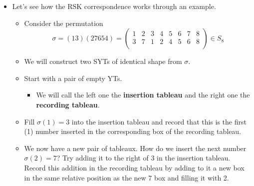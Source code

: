\documentclass[../notes.tex]{subfiles}
\begin{document}
\begin{itemize}
\begin{itemize}
    \end{itemize}
    \item Let's see how the RSK correspondence works through an example.
    \begin{itemize}
        \item Consider the permutation
        \begin{equation*}
            \sigma = (13)(27654) =
            \begin{pmatrix}
                1 & 2 & 3 & 4 & 5 & 6 & 7 & 8\\
                3 & 7 & 1 & 2 & 4 & 5 & 6 & 8\\
            \end{pmatrix}
            \in S_8
        \end{equation*}
        \item We will construct two SYTs of identical shape from $\sigma$.
        \item Start with a pair of empty YTs.
        \begin{center}
        \end{center}
        \begin{itemize}
            \item We will call the left one the \textbf{insertion tableau} and the right one the \textbf{recording tableau}.
        \end{itemize}
        \item Fill $\sigma(1)=3$ into the insertion tableau and record that this is the first (1) number inserted in the corresponding box of the recording tableau.
        \begin{center}
        \end{center}
        \item We now have a new pair of tableaux. How do we insert the next number $\sigma(2)=7$? Try adding it to the right of 3 in the insertion tableau. Record this addition in the recording tableau by adding to it a new box in the same relative position as the new 7 box and filling it with 2.

\end{itemize}
\end{itemize}
\end{document}
